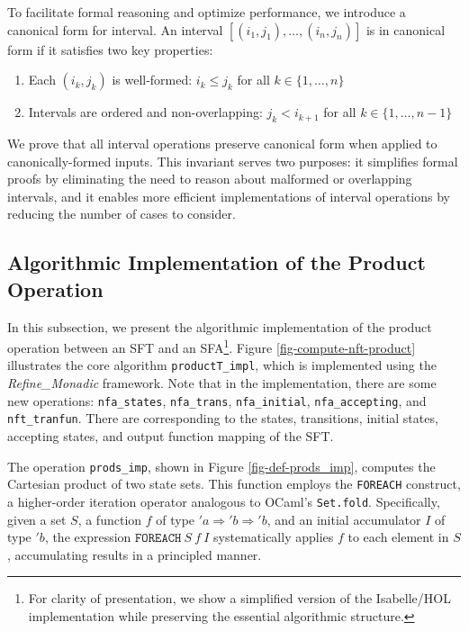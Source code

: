 \documentclass[a4paper,UKenglish,cleveref, autoref, anonymous, thm-restate]{lipics-v2021}
\begin{document}
To facilitate formal reasoning and optimize performance, we introduce a canonical form for interval. An interval $[(i_1, j_1), \ldots, (i_n, j_n)]$ is in canonical form if it satisfies two key properties:
\begin{enumerate}
  \item Each $(i_k, j_k)$ is well-formed: $i_k \leq j_k$ for all $k \in \{1,\ldots,n\}$
  \item Intervals are ordered and non-overlapping: $j_k < i_{k+1}$ for all $k \in \{1,\ldots,n-1\}$
\end{enumerate}

We prove that all interval operations preserve canonical form when applied to canonically-formed inputs. This invariant serves two purposes: it simplifies formal proofs by eliminating the need to reason about malformed or overlapping intervals, and it enables more efficient implementations of interval operations by reducing the number of cases to consider.



\subsection{Algorithmic Implementation of the Product Operation}

In this subsection, we present the algorithmic implementation of the product operation between an SFT and an SFA\footnote{For clarity of presentation, we show a simplified version of the Isabelle/HOL implementation while preserving the essential algorithmic structure.}. 
%
Figure \ref{fig-compute-nft-product} illustrates the core algorithm \texttt{productT\_impl}, which is implemented using the \emph{Refine\_Monadic} framework. Note that in the implementation, there are some new operations: \texttt{nfa\_states}, \texttt{nfa\_trans}, \texttt{nfa\_initial}, \texttt{nfa\_accepting}, and \texttt{nft\_tranfun}. There are corresponding to the states, transitions, initial states, accepting states, and output function mapping of the SFT.

The operation \texttt{prods\_imp}, shown in Figure \ref{fig-def-prods_imp}, computes the Cartesian product of two state sets. This function employs the \texttt{FOREACH} construct, a higher-order iteration operator analogous to OCaml's \texttt{Set.fold}. Specifically, given a set $S$, a function $f$ of type $'a \Rightarrow 'b \Rightarrow 'b$, and an initial accumulator $I$ of type $'b$, the expression $\texttt{FOREACH}~S~f~I$ systematically applies $f$ to each element in $S$, accumulating results in a principled manner.
\end{document}

